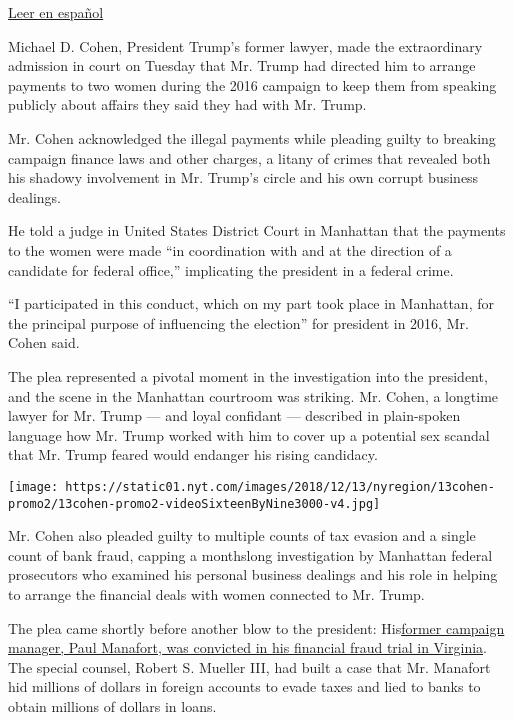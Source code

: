 \href{https://www.nytimes.com/es/2018/08/21/michael-cohen-cargos-trump}{Leer
en español}

Michael D. Cohen, President Trump's former lawyer, made the
extraordinary admission in court on Tuesday that Mr. Trump had directed
him to arrange payments to two women during the 2016 campaign to keep
them from speaking publicly about affairs they said they had with Mr.
Trump.

Mr. Cohen acknowledged the illegal payments while pleading guilty to
breaking campaign finance laws and other charges, a litany of crimes
that revealed both his shadowy involvement in Mr. Trump's circle and his
own corrupt business dealings.

He told a judge in United States District Court in Manhattan that the
payments to the women were made ``in coordination with and at the
direction of a candidate for federal office,'' implicating the president
in a federal crime.

``I participated in this conduct, which on my part took place in
Manhattan, for the principal purpose of influencing the election'' for
president in 2016, Mr. Cohen said.

The plea represented a pivotal moment in the investigation into the
president, and the scene in the Manhattan courtroom was striking. Mr.
Cohen, a longtime lawyer for Mr. Trump --- and loyal confidant ---
described in plain-spoken language how Mr. Trump worked with him to
cover up a potential sex scandal that Mr. Trump feared would endanger
his rising candidacy.

\texttt{[image: https://static01.nyt.com/images/2018/12/13/nyregion/13cohen-promo2/13cohen-promo2-videoSixteenByNine3000-v4.jpg]}

Mr. Cohen also pleaded guilty to multiple counts of tax evasion and a
single count of bank fraud, capping a monthslong investigation by
Manhattan federal prosecutors who examined his personal business
dealings and his role in helping to arrange the financial deals with
women connected to Mr. Trump.

The plea came shortly before another blow to the president:
His\href{https://www.nytimes.com/2018/08/21/us/politics/paul-manafort-trial-verdict.html}{former
campaign manager, Paul Manafort, was convicted in his financial fraud
trial in Virginia}. The special counsel, Robert S. Mueller III, had
built a case that Mr. Manafort hid millions of dollars in foreign
accounts to evade taxes and lied to banks to obtain millions of dollars
in loans.

